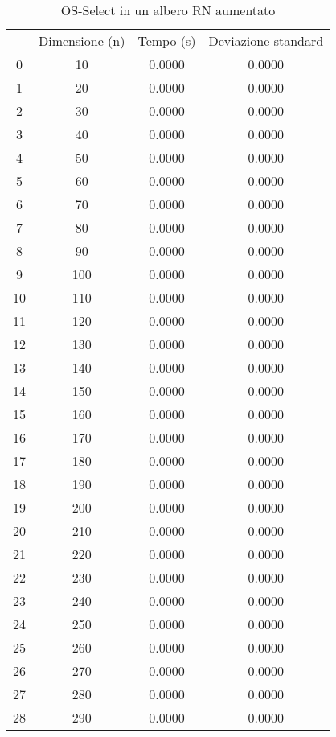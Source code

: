 \begin{table}[H]
\centering
\caption{OS-Select in un albero RN aumentato}
\label{OS-Select in un albero RN aumentato}
\begin{tabular}{cccc}
 & Dimensione (n) & Tempo (s) & Deviazione standard \\
0 & 10 & 0.0000 & 0.0000 \\
\cline{1-4}
1 & 20 & 0.0000 & 0.0000 \\
\cline{1-4}
2 & 30 & 0.0000 & 0.0000 \\
\cline{1-4}
3 & 40 & 0.0000 & 0.0000 \\
\cline{1-4}
4 & 50 & 0.0000 & 0.0000 \\
\cline{1-4}
5 & 60 & 0.0000 & 0.0000 \\
\cline{1-4}
6 & 70 & 0.0000 & 0.0000 \\
\cline{1-4}
7 & 80 & 0.0000 & 0.0000 \\
\cline{1-4}
8 & 90 & 0.0000 & 0.0000 \\
\cline{1-4}
9 & 100 & 0.0000 & 0.0000 \\
\cline{1-4}
10 & 110 & 0.0000 & 0.0000 \\
\cline{1-4}
11 & 120 & 0.0000 & 0.0000 \\
\cline{1-4}
12 & 130 & 0.0000 & 0.0000 \\
\cline{1-4}
13 & 140 & 0.0000 & 0.0000 \\
\cline{1-4}
14 & 150 & 0.0000 & 0.0000 \\
\cline{1-4}
15 & 160 & 0.0000 & 0.0000 \\
\cline{1-4}
16 & 170 & 0.0000 & 0.0000 \\
\cline{1-4}
17 & 180 & 0.0000 & 0.0000 \\
\cline{1-4}
18 & 190 & 0.0000 & 0.0000 \\
\cline{1-4}
19 & 200 & 0.0000 & 0.0000 \\
\cline{1-4}
20 & 210 & 0.0000 & 0.0000 \\
\cline{1-4}
21 & 220 & 0.0000 & 0.0000 \\
\cline{1-4}
22 & 230 & 0.0000 & 0.0000 \\
\cline{1-4}
23 & 240 & 0.0000 & 0.0000 \\
\cline{1-4}
24 & 250 & 0.0000 & 0.0000 \\
\cline{1-4}
25 & 260 & 0.0000 & 0.0000 \\
\cline{1-4}
26 & 270 & 0.0000 & 0.0000 \\
\cline{1-4}
27 & 280 & 0.0000 & 0.0000 \\
\cline{1-4}
28 & 290 & 0.0000 & 0.0000 \\

\end{tabular}
\end{table}
